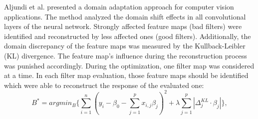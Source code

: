 \begin{comment}
\begin{figure}[H]
  \centering
  \texttt{[image: models\_state\_of\_the\_art/DCAN\_model.pdf]}
  \caption{DCAN architecture proposed by Li et al. \cite{li2020}}
  \label{fig:DCAN_model}
\end{figure}

\end{comment}

Aljundi et al. \cite{Aljundi2016} presented a domain adaptation approach for computer vision applications. The method analyzed the domain shift effects in all convolutional layers of the neural network. Strongly affected feature maps (bad filters) were identified and reconstructed by less affected ones (good filters). Additionally, the domain discrepancy of the feature maps was measured by the Kullback-Leibler (KL) divergence. The feature map's influence during the reconstruction process was punished accordingly. During the optimization, one filter map was considered at a time. In each filter map evaluation, those feature maps should be identified which were able to reconstruct the response of the evaluated one:
\begin{equation}
    B^{*} = argmin_{B} \{ \sum_{i=1}^{n}( y_{i}-\beta_{0}-\sum_{j=1}^{p}x_{i,j}\beta_{j})^{2} + \lambda \sum_{j=1}^{p}|\Delta_{j}^{KL}\cdot \beta_{j}| \},
\end{equation}
